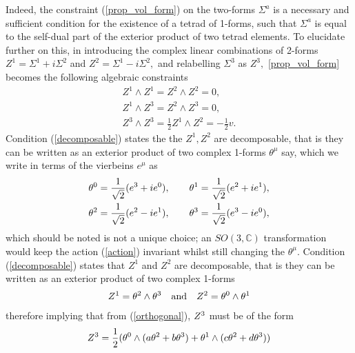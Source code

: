 \documentclass[a4paper,12pt, onecolumn, notitlepage]{article}
\theoremstyle{definition}
\theoremstyle{remark}
\newcommand{\m}{\mu}
\begin{document}
Indeed, the constraint (\ref{prop_vol_form}) on the two-forms $\Sigma^{a}$ is a necessary and sufficient condition for the existence of a tetrad of 1-forms, such that $\Sigma^{a}$ is equal to the self-dual part of the exterior product of two tetrad elements.
To elucidate further on this, in introducing the complex linear combinations of 2-forms $Z^{1} = \Sigma^{1}+ i\Sigma^{2}$ and $Z^{2} = \Sigma^{1}- i\Sigma^{2},$ and relabelling $\Sigma^{3}$ as $Z^{3},$ \cref{prop_vol_form} becomes the following algebraic constraints
\begin{subequations}
	\begin{gather}
	\label{decomposable}
	Z^{1}\wedge Z^{1}=Z^{2}\wedge Z^{2}=0,\\
	\label{orthogonal}
	Z^{1}\wedge Z^{3}= Z^{2}\wedge Z^{3}=0,\\
	\label{frame}
	Z^{3}\wedge Z^{3}=\frac{1}{2}Z^{1}\wedge Z^{2}=-\frac{1}{2}v.
	\end{gather}
\end{subequations}
Condition (\ref{decomposable}) states the the $Z^{1}, Z^{2}$ are decomposable, that is they can be written as an exterior product of two complex 1-forms $\theta^{\m}$ say, which we write in terms of the vierbeins $e^{\mu}$ as
\begin{gather*}
\theta\indices{^0}=\frac{1}{\sqrt{2}}(e\indices{^3}+ie\indices{^0}),\qquad\theta\indices{^1}=\frac{1}{\sqrt{2}}(e\indices{^2}+ie\indices{^1}),\\
\theta\indices{^2}=\frac{1}{\sqrt{2}}(e\indices{^2}-ie\indices{^1}),\qquad\theta\indices{^3}=\frac{1}{\sqrt{2}}(e\indices{^3}-ie\indices{^0}),
\end{gather*}
which should be noted is not a unique choice; an $SO(3,\mathbb{C})$ transformation would keep the action (\ref{action}) invariant whilst still changing the $\theta^{\m}.$ Condition (\ref{decomposable}) states that $Z^{1}$ and $Z^{2}$ are decomposable, that is they can be written as an exterior product of two complex 1-forms
\begin{align*}
	Z\indices{^1}=\theta\indices{^2}\wedge\theta\indices{^3}\quad\text{and}\quad
	Z\indices{^2}=\theta\indices{^0}\wedge\theta\indices{^1}
\end{align*}
therefore implying that from (\ref{orthogonal}),  $Z\indices{^3}$ must be of the form
\begin{equation*}
\label{z1z2}
	Z\indices{^3}=\frac{1}{2}(\theta\indices{^0}\wedge(a\theta\indices{^2} + b\theta\indices{^3}) + \theta\indices{^1}\wedge(c\theta{^2} + d\theta\indices{^3}))
\end{equation*}
\end{document}
